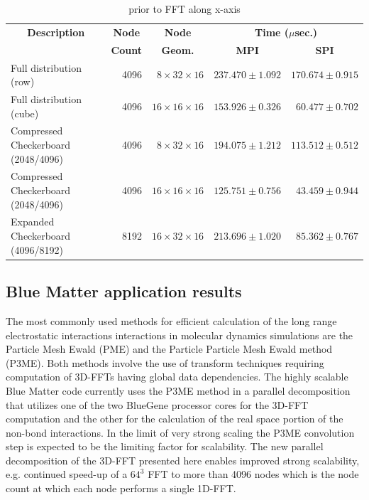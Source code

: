 \begin{table}
\begin{tabular}{|l|r|r|r|r|} \hline
\multicolumn{1}{|c|}{\bf Description} & \multicolumn{1}{c|}{\bf Node} & \multicolumn{1}{c|}{\bf Node} & \multicolumn{2}{|c|}{\bf Time
  ($\mu$sec.)} \\ \cline{4-5}
& \multicolumn{1}{c|}{\bf Count}& \multicolumn{1}{c|}{\bf Geom.}&
  \multicolumn{1}{c|}{\bf MPI} & \multicolumn{1}{c|}{\bf SPI} \\ \hline
Full distribution (row)  & 4096 & $8 \times 32\times 16$ & $ 237.470 \pm 1.092$ & $170.674 \pm 0.915$ \\ \hline
Full distribution (cube) & 4096 & $16\times 16\times 16$ & $ 153.926 \pm 0.326$ & $ 60.477 \pm 0.702$ \\ \hline
Compressed Checkerboard (2048/4096) & 4096 & $8 \times 32\times 16$ & $ 194.075 \pm 1.212$ & $113.512 \pm 0.512$ \\ \hline
Compressed Checkerboard (2048/4096) & 4096 & $16\times 16\times 16$ & $ 125.751 \pm 0.756$ & $ 43.459 \pm 0.944$ \\ \hline
Expanded Checkerboard (4096/8192) & 8192 & $16\times 32\times 16$ & $ 213.696 \pm 1.020$ & $85.362  \pm 0.767$ \\ \hline
\end{tabular}
\caption{\Alltoall prior to FFT along x-axis}
\label{tab:a2a_x}
\end{table}

\subsection{Blue Matter application results}
\label{sec:bluematter}
The most commonly used methods for efficient calculation of the long
range electrostatic interactions interactions in molecular dynamics
simulations are the Particle Mesh Ewald (PME)\cite{Darden1993} and the
Particle Particle Mesh Ewald method (P3ME)\cite{Hockney1988}. Both
methods involve the use of transform techniques requiring computation
of 3D-FFTs having global data dependencies. The highly scalable Blue Matter
code currently uses the P3ME method in a parallel decomposition that
utilizes one of the two BlueGene processor cores for the 3D-FFT
computation and the other for the calculation of the real space
portion of the non-bond interactions\cite{Fitch2006}. In the limit of
very strong scaling the P3ME convolution step is expected to be the
limiting factor for scalability. The new parallel decomposition of the
3D-FFT presented here enables improved strong scalability,
e.g. continued speed-up of a $64^3$ FFT to more than 4096 nodes which
is the node count at which each node performs a single 1D-FFT.


